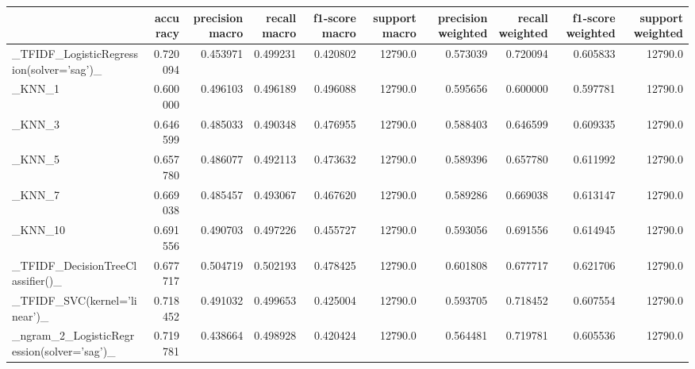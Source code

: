 \begin{tabular}{lrrrrrrrrr}
\toprule
{} &  accuracy &  precision macro &  recall macro &  f1-score macro &  support macro &  precision weighted &  recall weighted &  f1-score weighted &  support weighted \\
\midrule
\_TFIDF\_LogisticRegression(solver='sag')\_           &  0.720094 &         0.453971 &      0.499231 &        0.420802 &        12790.0 &            0.573039 &         0.720094 &           0.605833 &           12790.0 \\
\_KNN\_1                                             &  0.600000 &         0.496103 &      0.496189 &        0.496088 &        12790.0 &            0.595656 &         0.600000 &           0.597781 &           12790.0 \\
\_KNN\_3                                             &  0.646599 &         0.485033 &      0.490348 &        0.476955 &        12790.0 &            0.588403 &         0.646599 &           0.609335 &           12790.0 \\
\_KNN\_5                                             &  0.657780 &         0.486077 &      0.492113 &        0.473632 &        12790.0 &            0.589396 &         0.657780 &           0.611992 &           12790.0 \\
\_KNN\_7                                             &  0.669038 &         0.485457 &      0.493067 &        0.467620 &        12790.0 &            0.589286 &         0.669038 &           0.613147 &           12790.0 \\
\_KNN\_10                                            &  0.691556 &         0.490703 &      0.497226 &        0.455727 &        12790.0 &            0.593056 &         0.691556 &           0.614945 &           12790.0 \\
\_TFIDF\_DecisionTreeClassifier()\_                   &  0.677717 &         0.504719 &      0.502193 &        0.478425 &        12790.0 &            0.601808 &         0.677717 &           0.621706 &           12790.0 \\
\_TFIDF\_SVC(kernel='linear')\_                       &  0.718452 &         0.491032 &      0.499653 &        0.425004 &        12790.0 &            0.593705 &         0.718452 &           0.607554 &           12790.0 \\
\_ngram\_2\_LogisticRegression(solver='sag')\_         &  0.719781 &         0.438664 &      0.498928 &        0.420424 &        12790.0 &            0.564481 &         0.719781 &           0.605536 &           12790.0 \\

\end{tabular}
